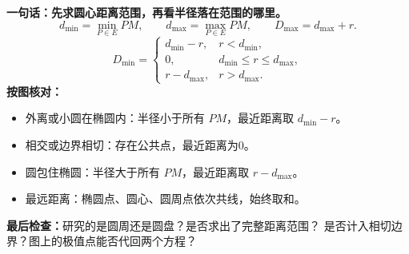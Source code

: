 \begin{summarybox}
\begin{minipage}{\linewidth}
\textbf{一句话：先求圆心距离范围，再看半径落在范围的哪里。}
\[
 d_{\min}=\min_{P\in E}PM,\qquad d_{\max}=\max_{P\in E}PM,
 \qquad D_{\max}=d_{\max}+r.
\]
\[
 D_{\min}=
 \begin{cases}
 d_{\min}-r,&r<d_{\min},\\
 0,&d_{\min}\le r\le d_{\max},\\
 r-d_{\max},&r>d_{\max}.
 \end{cases}
\]
\textbf{按图核对：}
\begin{itemize}[leftmargin=*,itemsep=3pt]
\item 外离或小圆在椭圆内：半径小于所有 $PM$，最近距离取 $d_{\min}-r$。
\item 相交或边界相切：存在公共点，最近距离为0。
\item 圆包住椭圆：半径大于所有 $PM$，最近距离取 $r-d_{\max}$。
\item 最远距离：椭圆点、圆心、圆周点依次共线，始终取和。
\end{itemize}
\textbf{最后检查：}研究的是圆周还是圆盘？是否求出了完整距离范围？
是否计入相切边界？图上的极值点能否代回两个方程？
\end{minipage}
\end{summarybox}

